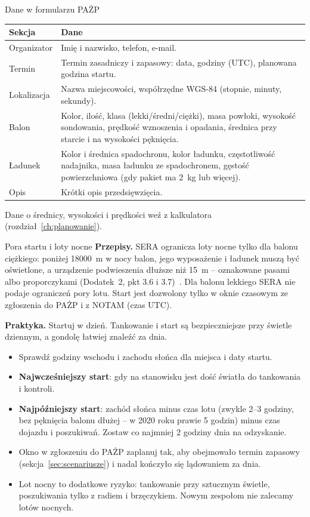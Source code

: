 \begin{podsekcja}{Dane w formularzu PAŻP}
\renewcommand{\arraystretch}{1.3}
\begin{tabularx}{\linewidth}{@{}P{26mm}L@{}}
\toprule
\textbf{Sekcja} & \textbf{Dane}\\\midrule
Organizator & Imię i nazwisko, telefon, e-mail.\\
Termin & Termin zasadniczy i zapasowy: data, godziny (UTC), planowana godzina startu.\\
Lokalizacja & Nazwa miejscowości, współrzędne WGS-84 (stopnie, minuty, sekundy).\\
Balon & Kolor, ilość, klasa (lekki/średni/ciężki), masa powłoki, wysokość sondowania, prędkość wznoszenia i opadania, średnica przy starcie i na wysokości pęknięcia.\\
Ładunek & Kolor i średnica spadochronu, kolor ładunku, częstotliwość nadajnika, masa ładunku ze spadochronem, gęstość powierzchniowa (gdy pakiet ma \SI{2}{kg} lub więcej).\\
Opis & Krótki opis przedsięwzięcia.\\
\bottomrule
\end{tabularx}

Dane o średnicy, wysokości i prędkości weź z kalkulatora (rozdział~\ref{ch:planowanie}).
\end{podsekcja}

\begin{sekcja}{Pora startu i loty nocne}\label{sec:pora-startu}
\textbf{Przepisy.} SERA ogranicza loty nocne tylko dla balonu ciężkiego: poniżej \SI{18000}{m} w nocy balon, jego wyposażenie i ładunek muszą być oświetlone, a urządzenie podwieszenia dłuższe niż \SI{15}{m} -- oznakowane pasami albo proporczykami (Dodatek~2, pkt 3.6 i 3.7)~\cite{sera}. Dla balonu lekkiego SERA nie podaje ograniczeń pory lotu. Start jest dozwolony tylko w oknie czasowym ze zgłoszenia do PAŻP i z NOTAM (czas UTC).

\textbf{Praktyka.} Startuj w dzień. Tankowanie i start są bezpieczniejsze przy świetle dziennym, a gondolę łatwiej znaleźć za dnia.
\begin{itemize}
  \item Sprawdź godziny wschodu i zachodu słońca dla miejsca i daty startu.
  \item \textbf{Najwcześniejszy start}: gdy na stanowisku jest dość światła do tankowania i kontroli.
  \item \textbf{Najpóźniejszy start}: zachód słońca minus czas lotu (zwykle 2--3 godziny, bez pęknięcia balonu dłużej -- w 2020 roku prawie 5 godzin) minus czas dojazdu i poszukiwań. Zostaw co najmniej 2 godziny dnia na odzyskanie.
  \item Okno w zgłoszeniu do PAŻP zaplanuj tak, aby obejmowało termin zapasowy (sekcja~\ref{sec:scenariusze}) i nadal kończyło się lądowaniem za dnia.
  \item Lot nocny to dodatkowe ryzyko: tankowanie przy sztucznym świetle, poszukiwania tylko z radiem i brzęczykiem. Nowym zespołom nie zalecamy lotów nocnych.
\end{itemize}
\end{sekcja}

